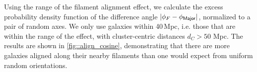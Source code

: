 \documentclass[usenatbib,useAMS]{mnras}
\theoremstyle{remark}
\newcommand{\peter}[1]{{\textcolor{green}{PM: #1}}}
\newcommand{\rachel}[1]{{\textcolor{cyan}{RM: #1}}}
\newcommand{\jab}[1]{{\textcolor{red}{JAB: #1}}}
\newcommand{\YC}[1]{{\textcolor{blue}{YC: #1}}}
\begin{document}
Using the range of the filament alignment effect, we calculate the excess probability density
function of the difference angle  $|\phi_F-\phi_{\sf Major}|$, 
normalized to a pair of random axes.
We only use galaxies within 40\,Mpc, i.e. those that are within the range of the effect, with
cluster-centric distances $d_C>50$ Mpc.
The results are shown in \autoref{fig::align_cosine}, demonstrating that there are more galaxies aligned along their nearby filaments than one would expect from uniform random orientations.

\end{document}
